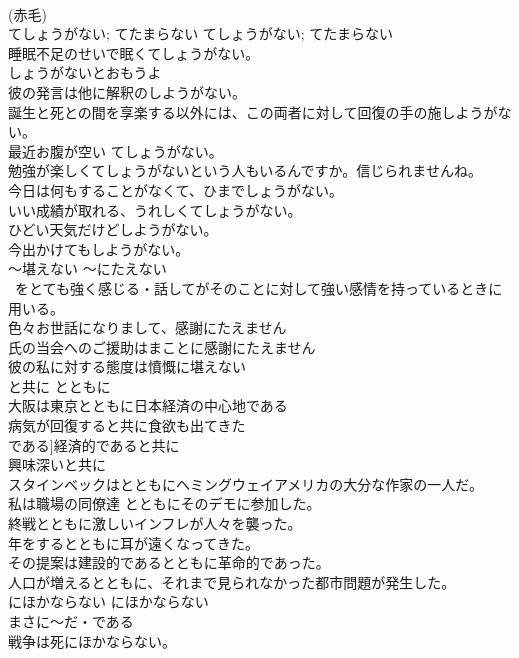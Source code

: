 \documentclass[8pt]{extreport}
\begin{document}
\begin{CJK}{UTF8}{min}
\\	(赤毛)
\\	てしょうがない; てたまらない	てしょうがない; てたまらない	
\\	睡眠不足のせいで眠くてしょうがない。  
\\	しょうがないとおもうよ  
\\	彼の発言は他に解釈のしようがない。   
\\	誕生と死との間を享楽する以外には、この両者に対して回復の手の施しようがない。   
\\	最近お腹が空い てしょうがない。  
\\	勉強が楽しくてしょうがないという人もいるんですか。信じられませんね。  
\\	今日は何もすることがなくて、ひまでしょうがない。   
\\	いい成績が取れる、うれしくてしょうがない。   
\\	ひどい天気だけどしようがない。   
\\	今出かけてもしようがない。   
\\	〜堪えない	〜にたえない	
\\	~をとても強く感じる・話してがそのことに対して強い感情を持っているときに用いる。	
\\	色々お世話になりまして、感謝にたえません  
\\	氏の当会へのご援助はまことに感謝にたえません  
\\	彼の私に対する態度は憤慨に堪えない   
\\	と共に	とともに	
\\	大阪は東京とともに日本経済の中心地である  
\\	病気が回復すると共に食欲も出てきた  
\\	である]経済的であると共に  
\\	興味深いと共に  
\\	スタインベックはとともにヘミングウェイアメリカの大分な作家の一人だ。  
\\	私は職場の同僚達 とともにそのデモに参加した。  
\\	終戦とともに激しいインフレが人々を襲った。   
\\	年をするとともに耳が遠くなってきた。   
\\	その提案は建設的であるとともに革命的であった。  
\\	人口が増えるとともに、それまで見られなかった都市問題が発生した。  
\\	にほかならない	にほかならない	
\\	まさに〜だ・である	
\\	戦争は死にほかならない。  

\end{CJK}
\end{document}
